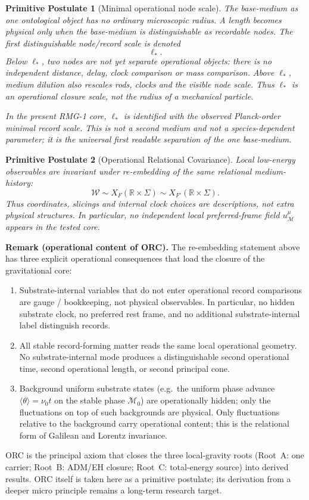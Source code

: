 \documentclass[11pt]{article}
\newtheorem{postulate}{Primitive Postulate}
\begin{document}
\begin{postulate}[Minimal operational node scale]
The base-medium as one ontological object has no ordinary microscopic radius.
A length becomes physical only when the base-medium is distinguishable as
recordable nodes.  The first distinguishable node/record scale is denoted
\[
\ell_*.
\]
Below \(\ell_*\), two nodes are not yet separate operational objects: there is
no independent distance, delay, clock comparison or mass comparison.  Above
\(\ell_*\), medium dilution also rescales rods, clocks and the visible node
scale.  Thus \(\ell_*\) is an operational closure scale, not the radius of a
mechanical particle.

In the present RMG-1 core, \(\ell_*\) is identified with the observed
Planck-order minimal record scale.  This is not a second medium and not a
species-dependent parameter; it is the universal first readable separation of
the one base-medium.
\end{postulate}

\begin{postulate}[Operational Relational Covariance]
Local low-energy observables are invariant under re-embedding of the same
relational medium-history:
\[
\mathcal W
\sim
X_F(\mathbb R\times\Sigma)
\sim
X_{F'}(\mathbb R\times\Sigma).
\]
Thus coordinates, slicings and internal clock choices are descriptions, not
extra physical structures.  In particular, no independent local preferred-frame
field $u^\mu_{\mathcal M}$ appears in the tested core.
\end{postulate}

\medskip\noindent\textbf{Remark (operational content of ORC).}
The re-embedding statement above has three explicit operational consequences
that load the closure of the gravitational core:
\begin{enumerate}
\item Substrate-internal variables that do not enter operational record
  comparisons are gauge / bookkeeping, not physical observables.  In
  particular, no hidden substrate clock, no preferred rest frame, and no
  additional substrate-internal label distinguish records.
\item All stable record-forming matter reads the same local operational
  geometry.  No substrate-internal mode produces a distinguishable second
  operational time, second operational length, or second principal cone.
\item Background uniform substrate states (e.g.\ the uniform phase advance
  $\langle\theta\rangle=\nu_0 t$ on the stable phase $\mathcal M_0$) are
  operationally hidden; only the fluctuations on top of such backgrounds
  are physical.  Only fluctuations relative to the background carry operational
  content; this is the relational form of Galilean and Lorentz invariance.
\end{enumerate}
ORC is the principal axiom that closes the three local-gravity roots
(Root~A: one carrier; Root~B: ADM/EH closure; Root~C: total-energy source)
into derived results.  ORC itself is taken here as a primitive postulate; its
derivation from a deeper micro principle remains a long-term research target.
\end{document}
